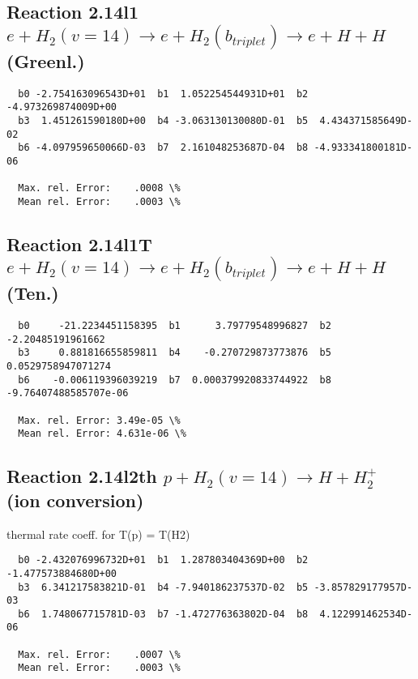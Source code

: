 \documentclass[12pt,dvipdfmx]{article}
\begin{document}
\newpage
\subsection{
Reaction 2.14l1
$ e + H_2(v=14) \rightarrow e + H_2(b_{triplet}) \rightarrow e + H + H $ (Greenl.)
}


\begin{small}\begin{verbatim}
  b0 -2.754163096543D+01  b1  1.052254544931D+01  b2 -4.973269874009D+00
  b3  1.451261590180D+00  b4 -3.063130130080D-01  b5  4.434371585649D-02
  b6 -4.097959650066D-03  b7  2.161048253687D-04  b8 -4.933341800181D-06

  Max. rel. Error:    .0008 \%
  Mean rel. Error:    .0003 \%
\end{verbatim}\end{small}


\subsection{
Reaction 2.14l1T
$ e +  H_2(v=14) \rightarrow e + H_2(b_{triplet}) \rightarrow e + H + H $ (Ten.)
}


\begin{small}\begin{verbatim}
  b0     -21.2234451158395  b1      3.79779548996827  b2     -2.20485191961662
  b3     0.881816655859811  b4    -0.270729873773876  b5    0.0529758947071274
  b6    -0.006119396039219  b7  0.000379920833744922  b8 -9.76407488585707e-06

  Max. rel. Error: 3.49e-05 \%
  Mean rel. Error: 4.631e-06 \%
\end{verbatim}\end{small}


\subsection{
Reaction 2.14l2th
$ p + H_2(v=14) \rightarrow H + H_2^+$ (ion conversion)
}
thermal rate coeff. for T(p) = T(H2)

\begin{small}\begin{verbatim}
  b0 -2.432076996732D+01  b1  1.287803404369D+00  b2 -1.477573884680D+00
  b3  6.341217583821D-01  b4 -7.940186237537D-02  b5 -3.857829177957D-03
  b6  1.748067715781D-03  b7 -1.472776363802D-04  b8  4.122991462534D-06

  Max. rel. Error:    .0007 \%
  Mean rel. Error:    .0003 \%
\end{verbatim}\end{small}
\end{document}
